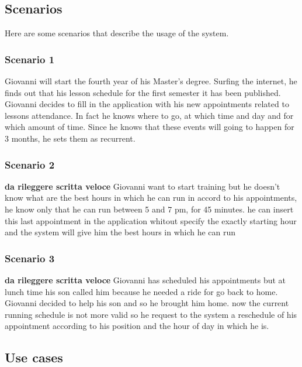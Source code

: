 \subsection{Scenarios}

Here are some scenarios that describe the usage of the system.

\subsubsection{Scenario 1} \label{scenario:1}
Giovanni will start the fourth year of his Master's degree. Surfing the internet, he finds out that his lesson schedule for the first semester it has been published. Giovanni decides to fill in the application with his new appointments related to lessons attendance. In fact he knows where to go, at which time and day and for which amount of time. Since he knows that these events will going to happen for 3 months, he sets them as recurrent.

\subsubsection{Scenario 2} \label{scenario:2}
\textbf{da rileggere scritta veloce}
Giovanni want to start training but he doesn't know what are the best hours in which he can run in accord to his appointments, he know only that he can run between 5 and 7 pm, for 45 minutes. he can insert this last appointment in the application whitout specify the exactly starting hour and the system will give him the best hours in which he can run

\subsubsection{Scenario 3} \label{scenario:3}
\textbf{da rileggere scritta veloce}
Giovanni has scheduled his appointments but at lunch time his son called him because he needed a ride for go back to home. Giovanni decided to help his son and so he brought him home. now the current running schedule is not more valid so he request to the system a reschedule of his appointment according to his position and the hour of day in which he is.  

\subsection{Use cases}

